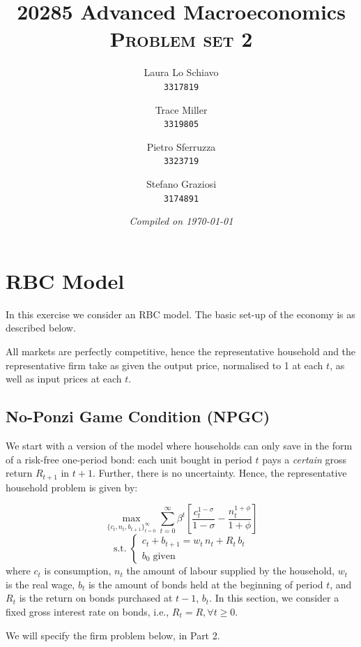 \documentclass[dvipsnames,11pt]{article}
\title{20285 Advanced Macroeconomics \\[0.5cm] \Huge \textsc{Problem set 2}}
\author{
        Laura Lo Schiavo \\
        \texttt{3317819}
        \and 
        Trace Miller \\
        \texttt{3319805}
        \and 
        Pietro Sferruzza \\
        \texttt{3323719}
        \and
        Stefano Graziosi\\
        \texttt{3174891}
        }
\date{\emph{Compiled on \today}}
\begin{document}
\maketitle

\tableofcontents

\vspace{0.5cm}

\section{RBC Model}

    In this exercise we consider an RBC model. The basic set-up of the economy is as described below.%

    \medskip

    All markets are perfectly competitive, hence the representative household and the representative firm take as given the output price, normalised to 1 at each $t$, as well as input prices at each $t$.

    \subsection{No-Ponzi Game Condition (NPGC)}

        We start with a version of the model where households can only save in the form of a risk-free one-period bond: each unit bought in period $t$ pays a \textit{certain} gross return $R_{t+1}$ in $t+1$. Further, there is no uncertainty.  Hence, the representative household problem is given by: 
        
        $$ \max_{\{c_t,n_t,b_{t+1}\}_{t=0}^{\infty}} \sum_{t=0}^\infty \beta^t\left[\frac{c_t^{1-\sigma}}{1-\sigma} - \frac{n_t^{1+\phi}}{1+\phi}\right] $$
        $$
        \mathrm{s.t.}\;
        \begin{cases}
        c_t + b_{t+1} = w_t\,n_t + R_{t}\,b_t
        \\
        b_0 \;\text{given}
        \end{cases}
        $$ 
        where $c_t$ is consumption, $n_t$ the amount of labour supplied by the household, $w_t$ is the real wage, $b_t$ is the amount of bonds held at the beginning of period $t$, and $R_{t}$ is the return on bonds purchased at $t-1$, $b_{t}$. In this section, we consider a fixed gross interest rate on bonds, i.e., $R_t = R, \forall t \geq 0$.

        \medskip

        We will specify the firm problem below, in Part 2.
\end{document}
